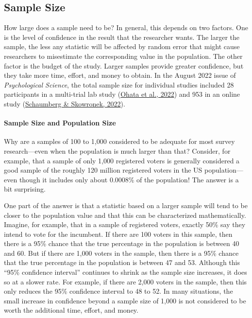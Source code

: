\documentclass[
]{krantz}
\begin{document}
\hypertarget{sample-size}{%
\subsection*{Sample Size}\label{sample-size}}


How large does a sample need to be? In general, this depends on two factors. One is the level of confidence in the result that the researcher wants. The larger the sample, the less any statistic will be affected by random error that might cause researchers to misestimate the corresponding value in the population. The other factor is the budget of the study. Larger samples provide greater confidence, but they take more time, effort, and money to obtain. In the August 2022 issue of \emph{Psychological Science}, the total sample size for individual studies included 28 participants in a multi-trial lab study (\protect\hyperlink{ref-ohata2022}{Ohata et al., 2022}) and 953 in an online study (\protect\hyperlink{ref-Schaumberg2022}{Schaumberg \& Skowronek, 2022}).

\hypertarget{sample-size-and-population-size}{%
\paragraph*{Sample Size and Population Size}\label{sample-size-and-population-size}}

Why are a samples of 100 to 1,000 considered to be adequate for most survey research---even when the population is much larger than that? Consider, for example, that a sample of only 1,000 registered voters is generally considered a good sample of the roughly 120 million registered voters in the US population---even though it includes only about 0.0008\% of the population! The answer is a bit surprising.

One part of the answer is that a statistic based on a larger sample will tend to be closer to the population value and that this can be characterized mathematically. Imagine, for example, that in a sample of registered voters, exactly 50\% say they intend to vote for the incumbent. If there are 100 voters in this sample, then there is a 95\% chance that the true percentage in the population is between 40 and 60. But if there are 1,000 voters in the sample, then there is a 95\% chance that the true percentage in the population is between 47 and 53. Although this ``95\% confidence interval'' continues to shrink as the sample size increases, it does so at a slower rate. For example, if there are 2,000 voters in the sample, then this only reduces the 95\% confidence interval to 48 to 52. In many situations, the small increase in confidence beyond a sample size of 1,000 is not considered to be worth the additional time, effort, and money.
\end{document}
